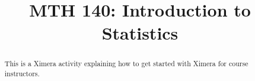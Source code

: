 \documentclass{xourse}
\title{MTH 140: Introduction to Statistics}
\begin{document}
  
\begin{abstract} %
This is a Ximera activity explaining how to get  
started with Ximera for course instructors.  
\end{abstract}  
\maketitle  
 
 
\end{document}
